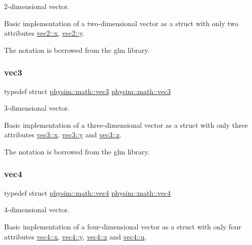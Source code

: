2-\/dimensional vector. 

Basic implementation of a two-\/dimensional vector as a struct with only two attributes \hyperlink{structphysim_1_1math_1_1vec2_a6a8f77a1b21b1ec2564c92468df19a89}{vec2\+::x}, \hyperlink{structphysim_1_1math_1_1vec2_aeed40ea44616cf9e3605e3e94b00d4d9}{vec2\+::y}.

The notation is borrowed from the \textquotesingle{}glm\textquotesingle{} library. \mbox{\label{namespacephysim_1_1math_a4641a15d91e1eed417901040c33d3c72}} 
\subsubsection{\texorpdfstring{vec3}{vec3}}
{\footnotesize\ttfamily typedef struct \hyperlink{structphysim_1_1math_1_1vec3}{physim\+::math\+::vec3}  \hyperlink{structphysim_1_1math_1_1vec3}{physim\+::math\+::vec3}}



3-\/dimensional vector. 

Basic implementation of a three-\/dimensional vector as a struct with only three attributes \hyperlink{structphysim_1_1math_1_1vec3_a1e6e6b869b8631d35d47f729d0e7b133}{vec3\+::x}, \hyperlink{structphysim_1_1math_1_1vec3_a9d8e3bdd74443a7bc8cf45c85d1d008a}{vec3\+::y} and \hyperlink{structphysim_1_1math_1_1vec3_a541880e43f1a7bd1b2c4524891a51727}{vec3\+::z}.

The notation is borrowed from the \textquotesingle{}glm\textquotesingle{} library. \mbox{\label{namespacephysim_1_1math_a325cbe58f444c9ff84ca5831849f35ca}} 
\subsubsection{\texorpdfstring{vec4}{vec4}}
{\footnotesize\ttfamily typedef struct \hyperlink{structphysim_1_1math_1_1vec4}{physim\+::math\+::vec4}  \hyperlink{structphysim_1_1math_1_1vec4}{physim\+::math\+::vec4}}



4-\/dimensional vector. 

Basic implementation of a four-\/dimensional vector as a struct with only four attributes \hyperlink{structphysim_1_1math_1_1vec4_a21bfa48cfaaf92c12e6af075ee661a3b}{vec4\+::x}, \hyperlink{structphysim_1_1math_1_1vec4_a718bf02c9b812d991467e1299de4b3d8}{vec4\+::y}, \hyperlink{structphysim_1_1math_1_1vec4_a46412c320c10c30f63dc4e54652f93f7}{vec4\+::z} and \hyperlink{structphysim_1_1math_1_1vec4_a04d868010d1b53431dbc96442d204685}{vec4\+::u}.

